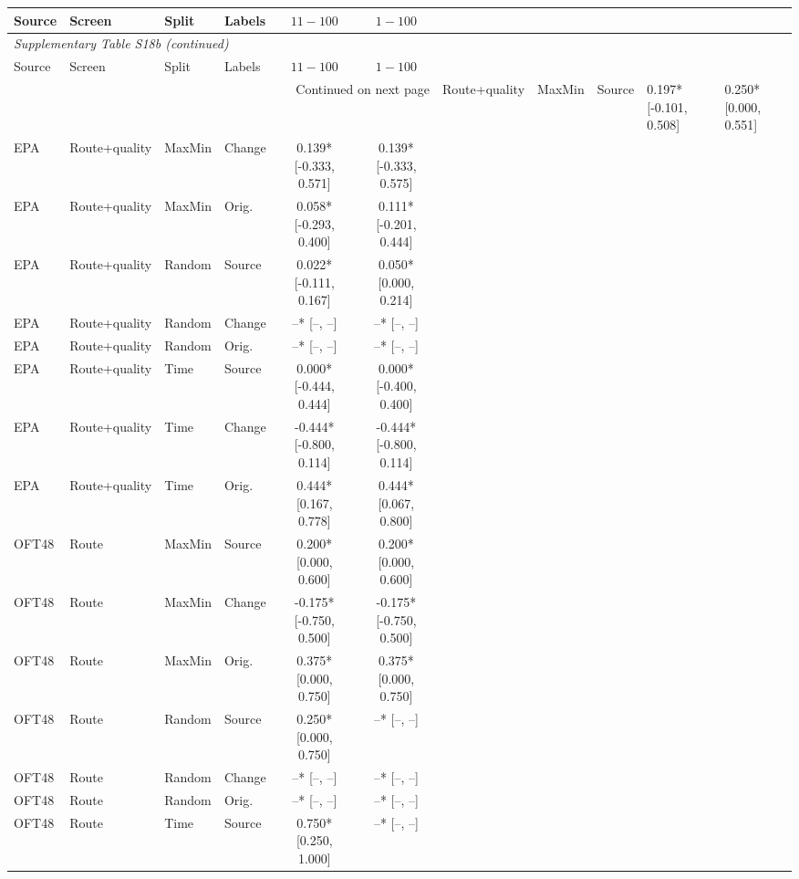 \begin{longtable}{llllcc}

\toprule Source & Screen & Split & Labels & $11-100$ & $1-100$ \\ \midrule\endfirsthead

\multicolumn{6}{l}{\textit{Supplementary Table S18b (continued)}} \\

\toprule Source & Screen & Split & Labels & $11-100$ & $1-100$ \\ \midrule\endhead

\midrule\multicolumn{6}{r}{Continued on next page}\endfoot\bottomrule\endlastfoot

EPA & Route+quality & MaxMin & Source & 0.197* [-0.101, 0.508] & 0.250* [0.000, 0.551] \\
EPA & Route+quality & MaxMin & Change & 0.139* [-0.333, 0.571] & 0.139* [-0.333, 0.575] \\
EPA & Route+quality & MaxMin & Orig. & 0.058* [-0.293, 0.400] & 0.111* [-0.201, 0.444] \\
EPA & Route+quality & Random & Source & 0.022* [-0.111, 0.167] & 0.050* [0.000, 0.214] \\
EPA & Route+quality & Random & Change & --* [--, --] & --* [--, --] \\
EPA & Route+quality & Random & Orig. & --* [--, --] & --* [--, --] \\
EPA & Route+quality & Time & Source & 0.000* [-0.444, 0.444] & 0.000* [-0.400, 0.400] \\
EPA & Route+quality & Time & Change & -0.444* [-0.800, 0.114] & -0.444* [-0.800, 0.114] \\
EPA & Route+quality & Time & Orig. & 0.444* [0.167, 0.778] & 0.444* [0.067, 0.800] \\
OFT48 & Route & MaxMin & Source & 0.200* [0.000, 0.600] & 0.200* [0.000, 0.600] \\
OFT48 & Route & MaxMin & Change & -0.175* [-0.750, 0.500] & -0.175* [-0.750, 0.500] \\
OFT48 & Route & MaxMin & Orig. & 0.375* [0.000, 0.750] & 0.375* [0.000, 0.750] \\
OFT48 & Route & Random & Source & 0.250* [0.000, 0.750] & --* [--, --] \\
OFT48 & Route & Random & Change & --* [--, --] & --* [--, --] \\
OFT48 & Route & Random & Orig. & --* [--, --] & --* [--, --] \\
OFT48 & Route & Time & Source & 0.750* [0.250, 1.000] & --* [--, --] \\

\end{longtable}

